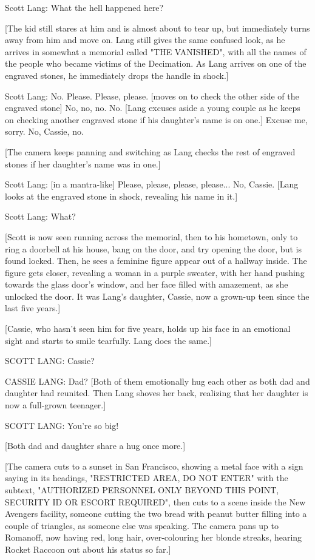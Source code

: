 Scott Lang: What the hell happened here?

[The kid still stares at him and is almost about to tear up, but immediately turns away from him and move on. Lang still gives the same confused look, as he arrives in somewhat a memorial called "THE VANISHED", with all the names of the people who became victims of the Decimation. As Lang arrives on one of the engraved stones, he immediately drops the handle in shock.]

Scott Lang: No. Please. Please, please. [moves on to check the other side of the engraved stone] No, no, no. No. [Lang excuses aside a young couple as he keeps on checking another engraved stone if his daughter's name is on one.] Excuse me, sorry. No, Cassie, no.

[The camera keeps panning and switching as Lang checks the rest of engraved stones if her daughter's name was in one.]

Scott Lang: [in a mantra-like] Please, please, please, please... No, Cassie. [Lang looks at the engraved stone in shock, revealing his name in it.]

Scott Lang: What?

[Scott is now seen running across the memorial, then to his hometown, only to ring a doorbell at his house, bang on the door, and try opening the door, but is found locked. Then, he sees a feminine figure appear out of a hallway inside. The figure gets closer, revealing a woman in a purple sweater, with her hand pushing towards the glass door's window, and her face filled with amazement, as she unlocked the door. It was Lang's daughter, Cassie, now a grown-up teen since the last five years.]

[Cassie, who hasn't seen him for five years, holds up his face in an emotional sight and starts to smile tearfully. Lang does the same.]

SCOTT LANG: Cassie?

CASSIE LANG: Dad? [Both of them emotionally hug each other as both dad and daughter had reunited. Then Lang shoves her back, realizing that her daughter is now a full-grown teenager.]

SCOTT LANG: You're so big!

[Both dad and daughter share a hug once more.]

[The camera cuts to a sunset in San Francisco, showing a metal face with a sign saying in its headings, "RESTRICTED AREA, DO NOT ENTER" with the subtext, "AUTHORIZED PERSONNEL ONLY BEYOND THIS POINT, SECURITY ID OR ESCORT REQUIRED", then cuts to a scene inside the New Avengers facility, someone cutting the two bread with peanut butter filling into a couple of triangles, as someone else was speaking. The camera pans up to Romanoff, now having red, long hair, over-colouring her blonde streaks, hearing Rocket Raccoon out about his status so far.]

